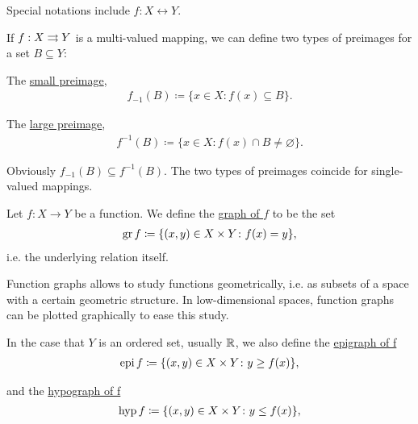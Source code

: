 \begin{definition}
\begin{itemize}
    Special notations include $f: X \longleftrightarrow Y$.
  \end{itemize}

  If $f : X \rightrightarrows Y$ is a multi-valued mapping, we can define two types of preimages for a set $B \subseteq Y$:
  \begin{defenum}
    \item The \uline{small preimage},
    \begin{align*}
      f_{-1}(B) \coloneqq \{ x \in X \colon f(x) \subseteq B \}.
    \end{align*}

    \item The \uline{large preimage},
    \begin{align*}
      f^{-1}(B) \coloneqq \{ x \in X \colon f(x) \cap B \neq \varnothing \}.
    \end{align*}
  \end{defenum}

  Obviously $f_{-1}(B) \subseteq f^{-1}(B)$. The two types of preimages coincide for single-valued mappings.
\end{definition}

\begin{definition}\label{def:function_graphs}
  Let $f: X \to Y$ be a function. We define the \uline{graph of $f$} to be the set
  \begin{align*}
    \operatorname{gr} f \coloneqq \{ (x, y) \in X \times Y \colon f(x) = y \},
  \end{align*}
  i.e. the underlying relation itself.

  Function graphs allows to study functions geometrically, i.e. as subsets of a space with a certain geometric structure. In low-dimensional spaces, function graphs can be plotted graphically to ease this study.

  In the case that $Y$ is an ordered set, usually $\mathbb R$, we also define the \uline{epigraph of f}
  \begin{align*}
    \operatorname{epi} f \coloneqq \{ (x, y) \in X \times Y \colon y \geq f(x) \},
  \end{align*}

  and the \uline{hypograph of f}
  \begin{align*}
    \operatorname{hyp} f \coloneqq \{ (x, y) \in X \times Y \colon y \leq f(x) \},
  \end{align*}
\end{definition}

